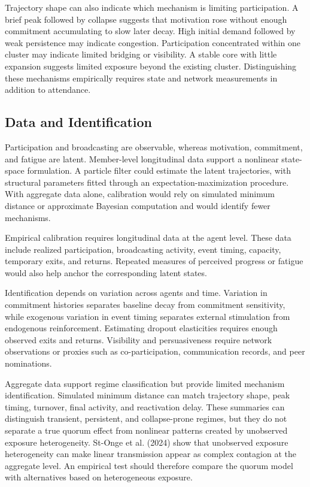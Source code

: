\documentclass[11pt]{article}
\begin{document}
Trajectory shape can also indicate which mechanism is limiting participation. A brief peak followed by collapse suggests that motivation rose without enough commitment accumulating to slow later decay. High initial demand followed by weak persistence may indicate congestion. Participation concentrated within one cluster may indicate limited bridging or visibility. A stable core with little expansion suggests limited exposure beyond the existing cluster. Distinguishing these mechanisms empirically requires state and network measurements in addition to attendance. 

\subsection{Data and Identification}

Participation and broadcasting are observable, whereas motivation, commitment, and fatigue are latent. Member-level longitudinal data support a nonlinear state-space formulation. A particle filter could estimate the latent trajectories, with structural parameters fitted through an expectation-maximization procedure. With aggregate data alone, calibration would rely on simulated minimum distance or approximate Bayesian computation and would identify fewer mechanisms.

Empirical calibration requires longitudinal data at the agent level. These data include realized participation, broadcasting activity, event timing, capacity, temporary exits, and returns. Repeated measures of perceived progress or fatigue would also help anchor the corresponding latent states.

Identification depends on variation across agents and time. Variation in commitment histories separates baseline decay from commitment sensitivity, while exogenous variation in event timing separates external stimulation from endogenous reinforcement. Estimating dropout elasticities requires enough observed exits and returns. Visibility and persuasiveness require network observations or proxies such as co-participation, communication records, and peer nominations. 

Aggregate data support regime classification but provide limited mechanism identification. Simulated minimum distance can match trajectory shape, peak timing, turnover, final activity, and reactivation delay. These summaries can distinguish transient, persistent, and collapse-prone regimes, but they do not separate a true quorum effect from nonlinear patterns created by unobserved exposure heterogeneity. St-Onge et al. (2024) show that unobserved exposure heterogeneity can make linear transmission appear as complex contagion at the aggregate level. An empirical test should therefore compare the quorum model with alternatives based on heterogeneous exposure.
\end{document}
